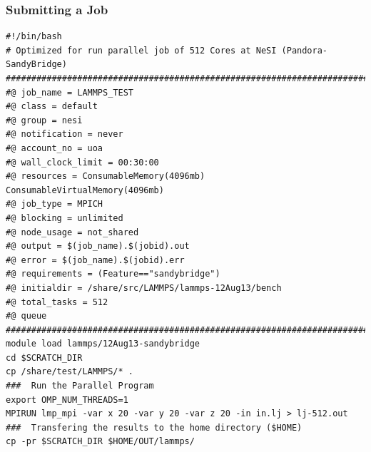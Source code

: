 \documentclass{beamer}
\begin{document}
\begin{frame}
  \frametitle{Submitting a Job}
\begin{verbatim}
#!/bin/bash
# Optimized for run parallel job of 512 Cores at NeSI (Pandora-SandyBridge)
##########################################################################
#@ job_name = LAMMPS_TEST
#@ class = default
#@ group = nesi
#@ notification = never
#@ account_no = uoa
#@ wall_clock_limit = 00:30:00
#@ resources = ConsumableMemory(4096mb) ConsumableVirtualMemory(4096mb)
#@ job_type = MPICH
#@ blocking = unlimited
#@ node_usage = not_shared
#@ output = $(job_name).$(jobid).out
#@ error = $(job_name).$(jobid).err
#@ requirements = (Feature=="sandybridge")
#@ initialdir = /share/src/LAMMPS/lammps-12Aug13/bench
#@ total_tasks = 512
#@ queue
##########################################################################
module load lammps/12Aug13-sandybridge
cd $SCRATCH_DIR
cp /share/test/LAMMPS/* .
###  Run the Parallel Program
export OMP_NUM_THREADS=1
MPIRUN lmp_mpi -var x 20 -var y 20 -var z 20 -in in.lj > lj-512.out
###  Transfering the results to the home directory ($HOME)
cp -pr $SCRATCH_DIR $HOME/OUT/lammps/
\end{verbatim}
\end{frame}

\end{document}
